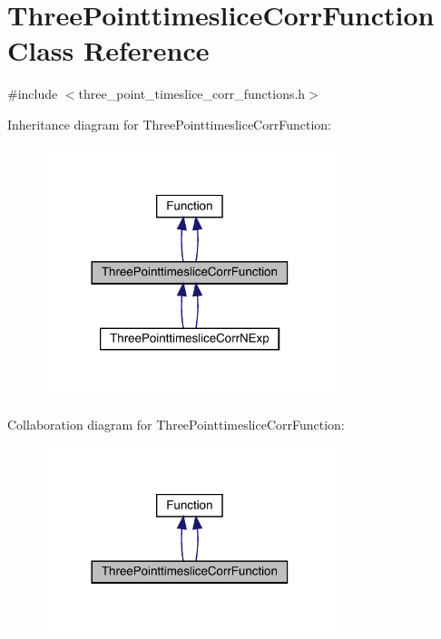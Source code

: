 \hypertarget{classThreePointtimesliceCorrFunction}{}\section{Three\+Pointtimeslice\+Corr\+Function Class Reference}
\label{classThreePointtimesliceCorrFunction}


{\ttfamily \#include $<$three\+\_\+point\+\_\+timeslice\+\_\+corr\+\_\+functions.\+h$>$}



Inheritance diagram for Three\+Pointtimeslice\+Corr\+Function\+:
\nopagebreak
\begin{figure}[H]
\begin{center}
\leavevmode
\includegraphics[width=242pt]{df/dbd/classThreePointtimesliceCorrFunction__inherit__graph}
\end{center}
\end{figure}


Collaboration diagram for Three\+Pointtimeslice\+Corr\+Function\+:
\nopagebreak
\begin{figure}[H]
\begin{center}
\leavevmode
\includegraphics[width=242pt]{db/d0d/classThreePointtimesliceCorrFunction__coll__graph}
\end{center}
\end{figure}
